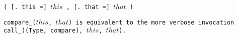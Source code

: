 
\s\tt{(} [\tt{. this =}]
$this$ \tt{,} [\tt{. that =}] $that$ \tt{)}


\tt{compare_(}$this$\tt{,} $that$\tt{)} is equivalent to the more
verbose invocation \tt{call_((Type, compare),} $this$\tt{,} $that$\tt{)}.
